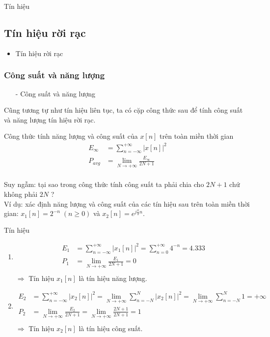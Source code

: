 \documentclass[8pt]{beamer}
\begin{document}
\begin{frame}{Tín hiệu}
\subsection{Tín hiệu rời rạc}
\begin{itemize}
	\item Tín hiệu rời rạc
\end{itemize}
\subsubsection{Công suất và năng lượng}
\begin{itemize}
	\item[-] Công suất và năng lượng
\end{itemize}
Cũng tương tự như tín hiệu liên tục, ta có cặp công thức sau để tính công suất và năng lượng tín hiệu rời rạc.
\begin{block}{Công thức tính năng lượng và công suất của $x[n]$ trên toàn miền thời gian}
\begin{equation*}
	\begin{split}
		E_{\infty}&=\sum_{n=-\infty}^{+\infty}|x[n]|^2 \\
		P_{avg}&=\lim_{N\to +\infty}\frac{E_{\infty}}{2N+1} \\
	\end{split}
\end{equation*}
\end{block}

Suy ngẫm: tại sao trong công thức tính công suất ta \alert{phải chia cho $2N+1$} chứ không phải $2N$ ?
\\ Ví dụ: xác định năng lượng và công suất của các tín hiệu sau trên toàn miền thời gian: $x_{1}[n]=2^{-n} \; (n\geq0)$ và $x_{2}[n]=e^{j\frac{\pi}{2}n}$.
\end{frame}
\begin{frame}{Tín hiệu}
\begin{enumerate}
	\item 
	\begin{equation*}
	\begin{split}
		E_{1}&=\sum_{n=-\infty}^{+\infty}|x_{1}[n]|^2=\sum_{n=0}^{+\infty}4^{-n}=4.333 \\
		P_{1}&=\lim_{N\to +\infty}\frac{E_{1}}{2N+1}=0\\
	\end{split}
\end{equation*}
$\Rightarrow$ Tín hiệu $x_{1}[n]$ là \alert{tín hiệu năng lượng}.
	\item 
	\begin{equation*}
	\begin{split}
		E_{2}&=\sum_{n=-\infty}^{+\infty}|x_{2}[n]|^2=\lim_{N\to +\infty}\sum_{n=-N}^{N}|x_{2}[n]|^2= \lim_{N\to +\infty}\sum_{n=-N}^{N}1=+\infty \\
		P_{2}&=\lim_{N\to+\infty}\frac{E_{2}}{2N+1}=\lim_{N\to+\infty}\frac{2N+1}{2N+1}=1 \\
	\end{split}
\end{equation*}
$\Rightarrow$ Tín hiệu $x_{2}[n]$ là \alert{tín hiệu công suất}.
\end{enumerate}
\end{frame}
\end{document}
